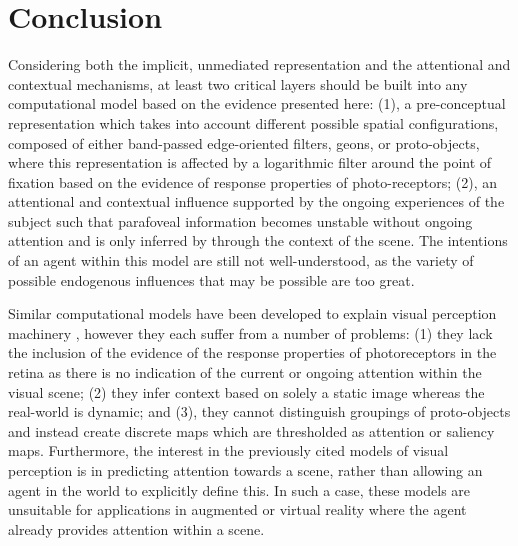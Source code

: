 \section{Conclusion}

Considering both the implicit, unmediated representation and the attentional and contextual mechanisms, at least two critical layers should be built into any computational model based on the evidence presented here:  (1), a pre-conceptual representation which takes into account different possible spatial configurations, composed of either band-passed edge-oriented filters, geons, or proto-objects, where this representation is affected by a logarithmic filter around the point of fixation based on the evidence of response properties of photo-receptors; (2), an attentional and contextual influence supported by the ongoing experiences of the subject such that parafoveal information becomes unstable without ongoing attention and is only inferred by through the context of the scene.  The intentions of an agent within this model are still not well-understood, as the variety of possible endogenous influences that may be possible are too great.  

Similar computational models have been developed to explain visual perception machinery \cite{Walther2006,Orabona2007a}, however they each suffer from a number of problems: (1) they lack the inclusion of the evidence of the response properties of photoreceptors in the retina as there is no indication of the current or ongoing attention within the visual scene; (2) they infer context based on solely a static image whereas the real-world is dynamic; and (3), they cannot distinguish groupings of proto-objects and instead create discrete maps which are thresholded as attention or saliency maps.  Furthermore, the interest in the previously cited models of visual perception is in predicting attention towards a scene, rather than allowing an agent in the world to explicitly define this.  In such a case, these models are unsuitable for applications in augmented or virtual reality where the agent already provides attention within a scene.  

